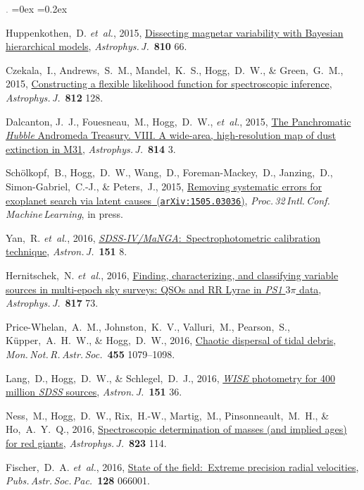 \documentclass[12pt,letterpaper]{article}
\newcommand{\latin}[1]{\textsl{#1}}
\newcommand{\etal}{\latin{et~al.}}
\newcommand{\satellite}[1]{\textsl{#1}}
\newcommand{\project}[1]{\textsl{#1}}
\newcommand{\doi}[2]{\href{http://dx.doi.org/#1}{{#2}}}
\newcommand{\arxiv}[2]{\href{http://arxiv.org/abs/#1}{{#2}\ (\texttt{arXiv:#1})}}
\newcommand{\deemph}[1]{\textcolor{grey}{\footnotesize{#1}}}
\newcommand{\pubnumber}[1]{\deemph{{#1}.}}
\newcounter{refpubnum}
\newcommand{\hogglist}{%
    \rightmargin=0in
    \leftmargin=0.18in
    \topsep=0ex
    \partopsep=0pt
    \itemsep=0.2ex
    \parsep=0pt
    \itemindent=-1.0\leftmargin
    \listparindent=0.0\leftmargin
    \settowidth{\labelsep}{~}
    \usecounter{refpubnum}
  }
\begin{document}
\begin{list}{\pubnumber{\therefpubnum}}{\hogglist}
\item
Huppenkothen,~D. \etal, 2015,
\doi{10.1088/0004-637X/810/1/66}{Dissecting magnetar variability with
  Bayesian hierarchical models},
\textit{Astrophys.\,J.}\ \textbf{810} 66.
\item
Czekala,~I., Andrews,~S.~M., Mandel,~K.~S., Hogg,~D.~W., \& Green,~G.~M., 2015,
\doi{10.1088/0004-637X/812/2/128}{Constructing a flexible likelihood
  function for spectroscopic inference},
\textit{Astrophys.\,J.}\ \textbf{812} 128.
\item
Dalcanton, J.~J., Fouesneau,~M., Hogg,~D.~W., \etal, 2015,
\doi{10.1088/0004-637X/814/1/3}{The Panchromatic \satellite{Hubble} Andromeda Treasury. VIII.
A wide-area, high-resolution map of dust extinction in M31},
\textit{Astrophys.\,J.}\ \textbf{814} 3.
\item
Sch\"olkopf,~B., Hogg,~D.~W., Wang,~D., Foreman-Mackey,~D., Janzing,~D.,
Simon-Gabriel,~C.-J., \& Peters,~J., 2015,
\arxiv{1505.03036}{Removing systematic errors for exoplanet search via latent causes},
\textit{Proc.\,32\,Intl.\,Conf.\,Machine\,Learning}, in press.
\item
Yan,~R. \etal, 2016,
\doi{10.3847/0004-6256/151/1/8}{\project{SDSS-IV/MaNGA}:\ Spectrophotometric calibration technique},
\textit{Astron.\,J.}\ \textbf{151} 8.
\item
Hernitschek,~N. \etal, 2016,
\doi{10.3847/0004-637X/817/1/73}{Finding, characterizing, and classifying variable sources in
multi-epoch sky surveys: QSOs and RR Lyrae in \project{PS1} $3\pi$ data},
\textit{Astrophys.\,J.}\ \textbf{817} 73.
\item
Price-Whelan,~A.~M., Johnston,~K.~V., Valluri,~M., Pearson,~S.,
K\"upper,~A.~H.~W., \& Hogg,~D.~W., 2016,
\doi{10.1093/mnras/stv2383}{Chaotic dispersal of tidal debris},
\textit{Mon.\,Not.\,R.\,Astr.\,Soc.}\ \textbf{455} 1079--1098.
\item
Lang,~D., Hogg,~D.~W., \& Schlegel,~D.~J., 2016,
\doi{10.3847/0004-6256/151/2/36}{\project{WISE} photometry for 400 million \project{SDSS} sources},
\textit{Astron.\,J.}\ \textbf{151} 36.
\item
Ness,~M., Hogg,~D.~W., Rix,~H.-W., Martig,~M., Pinsonneault,~M.~H., \& Ho,~A.~Y.~Q., 2016,
\doi{10.3847/0004-637X/823/2/114}{Spectroscopic determination of masses (and implied ages) for red giants},
\textit{Astrophys.\,J.}\ \textbf{823} 114.
\item
Fischer,~D.~A. \etal, 2016,
\doi{10.1088/1538-3873/128/964/066001}{State of the field:\ Extreme precision radial velocities},
\textit{Pubs.\,Astr.\,Soc.\,Pac.}\ \textbf{128} 066001.

\end{list}
\end{document}
